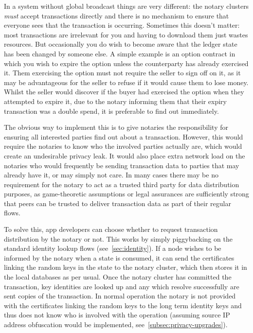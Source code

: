 \documentclass{article}
\begin{document}
In a system without global broadcast things are very different: the notary clusters \emph{must} accept transactions
directly and there is no mechanism to ensure that everyone sees that the transaction is occurring. Sometimes this
doesn't matter: most transactions are irrelevant for you and having to download them just wastes resources. But
occasionally you do wish to become aware that the ledger state has been changed by someone else. A simple example
is an option contract in which you wish to expire the option unless the counterparty has already exercised it. Them
exercising the option must not require the seller to sign off on it, as it may be advantageous for the seller to
refuse if it would cause them to lose money. Whilst the seller would discover if the buyer had exercised the option
when they attempted to expire it, due to the notary informing them that their expiry transaction was a double
spend, it is preferable to find out immediately.

The obvious way to implement this is to give notaries the responsibility for ensuring all interested parties find
out about a transaction. However, this would require the notaries to know who the involved parties actually are,
which would create an undesirable privacy leak. It would also place extra network load on the notaries who would
frequently be sending transaction data to parties that may already have it, or may simply not care. In many cases
there may be no requirement for the notary to act as a trusted third party for data distribution purposes, as
game-theoretic assumptions or legal assurances are sufficiently strong that peers can be trusted to deliver
transaction data as part of their regular flows.

To solve this, app developers can choose whether to request transaction distribution by the notary or not. This
works by simply piggybacking on the standard identity lookup flows (see~\cref{sec:identity}). If a node
wishes to be informed by the notary when a state is consumed, it can send the certificates linking the random keys
in the state to the notary cluster, which then stores it in the local databases as per usual. Once the notary
cluster has committed the transaction, key identities are looked up and any which resolve successfully are sent
copies of the transaction. In normal operation the notary is not provided with the certificates linking the random
keys to the long term identity keys and thus does not know who is involved with the operation (assuming source IP
address obfuscation would be implemented, see~\cref{subsec:privacy-upgrades}).
\end{document}
